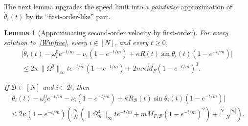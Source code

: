 \documentclass[11pt,reqno]{amsart}
\newtheorem{lemma}{Lemma}[section]
\theoremstyle{definition}
\theoremstyle{remark}
\begin{document}
The next lemma upgrades the speed limit into a \emph{pointwise}
approximation of $\dot\theta_i(t)$ by its ``first-order-like'' part.

\begin{lemma}[Approximating second-order velocity by first-order]\label{lem:orderlowering}
For every solution to~\eqref{Winfree}, every $i\in[N]$, and every $t\ge 0$,
\begin{multline*}
\bigl|\dot\theta_i(t)-\omega_i^0 e^{-t/m}-\nu_i(1-e^{-t/m})+\kappa R(t)\sin\theta_i(t)(1-e^{-t/m})\bigr|\\
\le 2\kappa\,\|\Omega^0\|_\infty t e^{-t/m}(1-e^{-t/m})+2m\kappa M_F(1-e^{-t/m})^{3}.
\end{multline*}

If $\mathcal{B}\subset [N]$ and $i\in \mathcal{B}$, then
\begin{multline*}
	\bigl|\dot\theta_i(t)-\omega_i^0 e^{-t/m}-\nu_i(1-e^{-t/m})+\kappa R_\mathcal{B}(t)\sin\theta_i(t)(1-e^{-t/m})\bigr|\\
	\le 2\kappa (1-e^{-t/m})\left(\frac{|\mathcal{B}|}{N} \left(\|\Omega_\mathcal{B}^0\|_\infty te^{-t/m}+m M_{F,\mathcal{B}}(1-e^{-t/m})^2\right)+\frac{N-|\mathcal{B}|}{N} \right).
\end{multline*}
\end{lemma}
\end{document}
